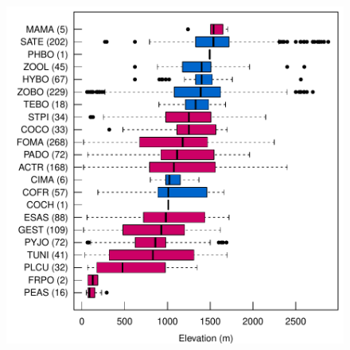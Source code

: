 \documentclass{article}
\begin{document}
\begin{figure}
\includegraphics{figures/zoizos-boxalti}
\caption{\label{boxalti}}
\end{figure}

	
\end{document}
